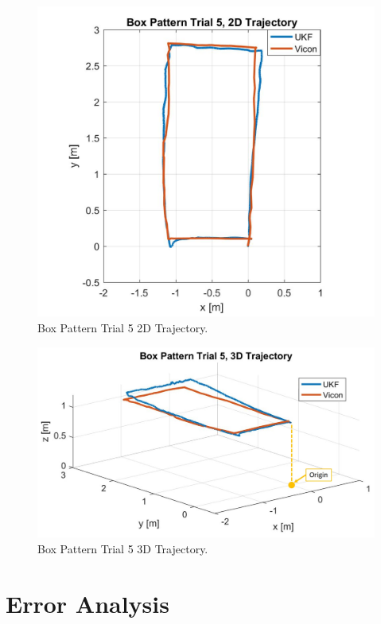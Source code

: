 \begin{figure}[p]
  \centering
    \includegraphics[height=0.4\textheight]{box5_2d}
  \caption[Box Pattern Trial 5 2D Trajectory]{Box Pattern Trial 5 2D Trajectory.}
  \label{fig:box5_2d}
\end{figure}
\begin{figure}[p]
  \centering
    \includegraphics[height=0.4\textheight]{box5_3d}
  \caption[Box Pattern Trial 5 3D Trajectory]{Box Pattern Trial 5 3D Trajectory.}
  \label{fig:box5_3d}
\end{figure}
\clearpage

\section{Error Analysis}

